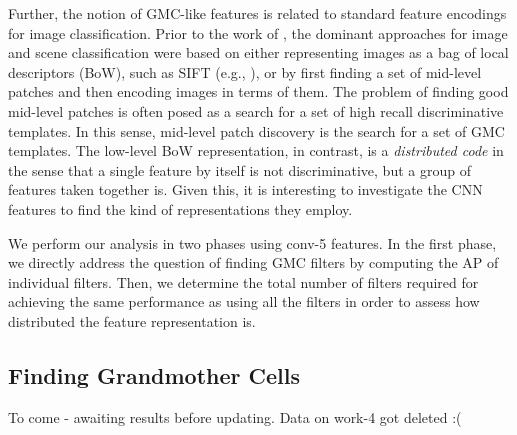 Further, the notion of GMC-like features is related to standard feature encodings for image classification.
Prior to the work of \cite{Kriz}, the dominant approaches for image and scene classification were based on either representing images as a bag of local descriptors (BoW), such as SIFT (e.g., \cite{SPM}), or by first finding a set of mid-level patches \cite{Mid1,Blocks} and then encoding images in terms of them. 
The problem of finding good mid-level patches is often posed as a search for a set of high recall discriminative templates. 
In this sense, mid-level patch discovery is the search for a set of GMC templates. 
The low-level BoW representation, in contrast, is a \emph{distributed code} in the sense that a single feature by itself is not discriminative, but a group of features taken together is.
Given this, it is interesting to investigate the CNN features to find the kind of representations they employ.

We perform our analysis in two phases using conv-5 features. In the first phase, we directly address the question of finding GMC filters by computing the AP of individual filters. Then, we determine the total number of filters required for achieving the same performance as using all the filters in order to assess how distributed the feature representation is.

\subsection{Finding Grandmother Cells}
\label{sub:class-specific-unit}
To come - awaiting results before updating. Data on work-4 got deleted :(

